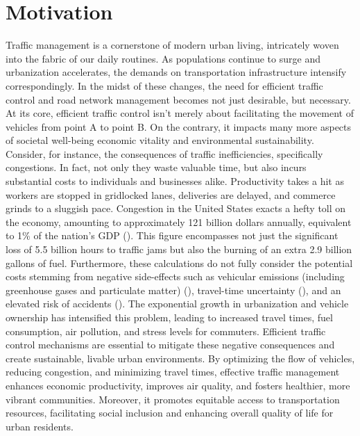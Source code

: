 \chapter{Motivation}

Traffic management is a cornerstone of modern urban living, intricately woven into the fabric of our daily routines. As populations continue to surge and urbanization accelerates, the demands on transportation infrastructure intensify correspondingly. In the midst of these changes, the need for efficient traffic control and road network management becomes not just desirable, but necessary. At its core, efficient traffic control isn't merely about facilitating the movement of vehicles from point A to point B. On the contrary, it impacts many more aspects of societal well-being economic vitality and environmental sustainability. Consider, for instance, the consequences of traffic inefficiencies, specifically congestions. In fact, not only they waste valuable time, but also incurs substantial costs to individuals and businesses alike. Productivity takes a hit as workers are stopped in gridlocked lanes, deliveries are delayed, and commerce grinds to a sluggish pace. Congestion in the United States exacts a hefty toll on the economy, amounting to approximately 121 billion dollars annually, equivalent to 1\% of the nation's GDP (\cite{schrank2012}). This figure encompasses not just the significant loss of 5.5 billion hours to traffic jams but also the burning of an extra 2.9 billion gallons of fuel. Furthermore, these calculations do not fully consider the potential costs stemming from negative side-effects such as vehicular emissions (including greenhouse gases and particulate matter) (\cite{pant2013}), travel-time uncertainty (\cite{carrion2012}), and an elevated risk of accidents (\cite{hennessy1999}). The exponential growth in urbanization and vehicle ownership has intensified this problem, leading to increased travel times, fuel consumption, air pollution, and stress levels for commuters. Efficient traffic control mechanisms are essential to mitigate these negative consequences and create sustainable, livable urban environments. By optimizing the flow of vehicles, reducing congestion, and minimizing travel times, effective traffic management enhances economic productivity, improves air quality, and fosters healthier, more vibrant communities. Moreover, it promotes equitable access to transportation resources, facilitating social inclusion and enhancing overall quality of life for urban residents. \\
